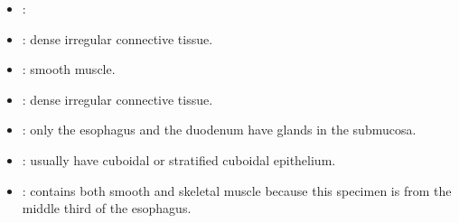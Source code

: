 \begin{itemize}
  \begin{multicols}{2}
  \begin{itemize}
    \item {}: 
    
    \begin{center}
    \end{center}
    
    \item {}: dense irregular connective tissue.
    
    \begin{center}
    \end{center}
    
    \item {}: smooth muscle.
    
    \begin{center}
    \end{center}
    
    \item {}: dense irregular connective tissue.
    
    \begin{center}
    \end{center}

    \item {}: only the esophagus and the duodenum have glands in the submucosa.
    
    \begin{center}
    \end{center}
    
    \item {}: usually have cuboidal or stratified cuboidal epithelium.
    
    \begin{center}
    \end{center}
    
    \item {}: contains both smooth and skeletal muscle because this specimen is from the middle third of the esophagus.   
    
    \begin{center}
    \end{center}
    

\end{itemize}
\end{multicols}
\end{itemize}

